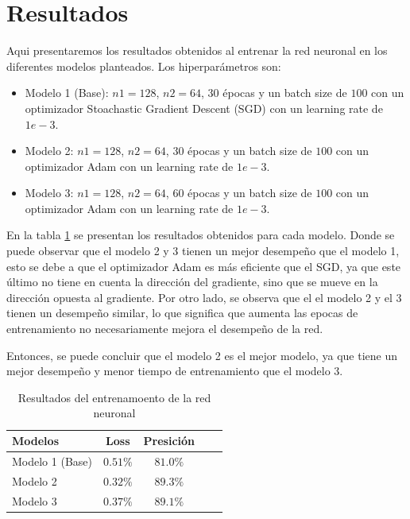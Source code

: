 \documentclass[aps,prl,reprint,groupedaddress]{revtex4-2}
\begin{document}
\section{Resultados}

Aqui presentaremos los resultados obtenidos al entrenar la red neuronal en los 
diferentes modelos planteados. Los hiperparámetros son:

\begin{itemize}
  \item Modelo 1 (Base): $n1=128$, $n2=64$, $30$ épocas y un batch size de $100$ 
  con un optimizador Stoachastic Gradient Descent (SGD) con un learning rate 
  de $1e-3$.
  \item Modelo 2: $n1=128$, $n2=64$, $30$ épocas y un batch size de $100$ con un
  optimizador Adam con un learning rate de $1e-3$.
  \item Modelo 3: $n1=128$, $n2=64$, $60$ épocas y un batch size de $100$ con un
  optimizador Adam con un learning rate de $1e-3$.
\end{itemize}

En la tabla \ref{tab:models} se presentan los resultados obtenidos para cada
modelo. Donde se puede observar que el modelo 2 y 3 tienen un mejor desempeño
que el modelo 1, esto se debe a que el optimizador Adam es más eficiente que el
SGD, ya que este último no tiene en cuenta la dirección del gradiente, sino que
se mueve en la dirección opuesta al gradiente. Por otro lado, se observa que el
el modelo 2 y el 3 tienen un desempeño similar, lo que significa que aumenta 
las epocas de entrenamiento no necesariamente mejora el desempeño de la red.

Entonces, se puede concluir que el modelo 2 es el mejor modelo, ya que tiene un
mejor desempeño y menor tiempo de entrenamiento que el modelo 3.

\begin{table}[h!]
  \begin{tabular}{lccll}
    \hline
    Modelos         & Loss      & Presición & \\ \hline
    Modelo 1 (Base) & $0.51\% $ & $81.0\%$  & \\
    Modelo 2        & $0.32\% $ & $89.3\%$  & \\
    Modelo 3        & $0.37\% $ & $89.1\%$  & \\ \hline
  \end{tabular}
  \caption{Resultados del entrenamoento de la red neuronal}
  \label{tab:models}
\end{table}
\end{document}
